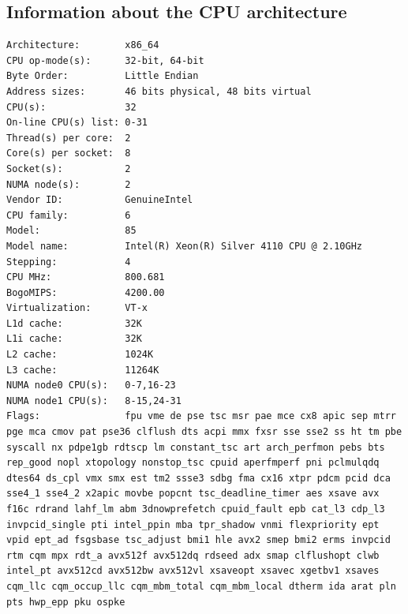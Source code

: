 	\subsection{Information about the CPU architecture}
	\begin{lstlisting}[frame=single]
Architecture:        x86_64
CPU op-mode(s):      32-bit, 64-bit
Byte Order:          Little Endian
Address sizes:       46 bits physical, 48 bits virtual
CPU(s):              32
On-line CPU(s) list: 0-31
Thread(s) per core:  2
Core(s) per socket:  8
Socket(s):           2
NUMA node(s):        2
Vendor ID:           GenuineIntel
CPU family:          6
Model:               85
Model name:          Intel(R) Xeon(R) Silver 4110 CPU @ 2.10GHz
Stepping:            4
CPU MHz:             800.681
BogoMIPS:            4200.00
Virtualization:      VT-x
L1d cache:           32K
L1i cache:           32K
L2 cache:            1024K
L3 cache:            11264K
NUMA node0 CPU(s):   0-7,16-23
NUMA node1 CPU(s):   8-15,24-31
Flags:               fpu vme de pse tsc msr pae mce cx8 apic sep mtrr pge mca cmov pat pse36 clflush dts acpi mmx fxsr sse sse2 ss ht tm pbe syscall nx pdpe1gb rdtscp lm constant_tsc art arch_perfmon pebs bts rep_good nopl xtopology nonstop_tsc cpuid aperfmperf pni pclmulqdq dtes64 ds_cpl vmx smx est tm2 ssse3 sdbg fma cx16 xtpr pdcm pcid dca sse4_1 sse4_2 x2apic movbe popcnt tsc_deadline_timer aes xsave avx f16c rdrand lahf_lm abm 3dnowprefetch cpuid_fault epb cat_l3 cdp_l3 invpcid_single pti intel_ppin mba tpr_shadow vnmi flexpriority ept vpid ept_ad fsgsbase tsc_adjust bmi1 hle avx2 smep bmi2 erms invpcid rtm cqm mpx rdt_a avx512f avx512dq rdseed adx smap clflushopt clwb intel_pt avx512cd avx512bw avx512vl xsaveopt xsavec xgetbv1 xsaves cqm_llc cqm_occup_llc cqm_mbm_total cqm_mbm_local dtherm ida arat pln pts hwp_epp pku ospke
\end{lstlisting}
	
